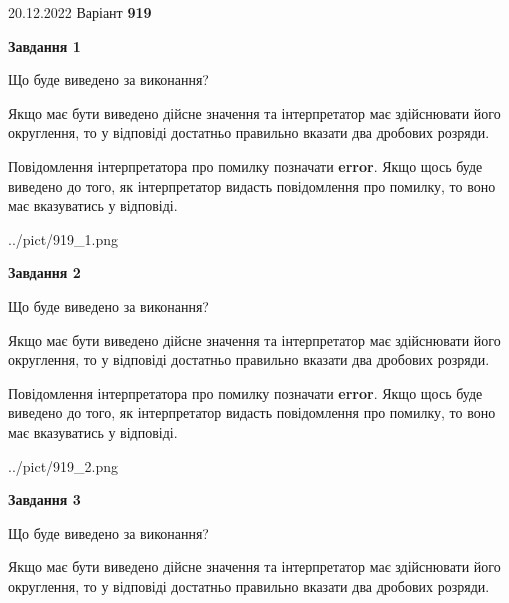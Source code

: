 \documentclass[12pt, ukrainian]{article}
\begin{document}
{20.12.2022 Варіант \No \textbf { 919 }\par}
{
\begin {Large}

{\begin {center}\textbf{Завдання 1}\end {center}}\par
Що буде виведено за виконання? \par

Якщо має бути виведено дійсне значення та інтерпретатор має здійснювати його округлення, 
то у відповіді достатньо правильно вказати два дробових розряди.

Повідомлення інтерпретатора про помилку позначати \textbf{error}.
Якщо щось буде виведено до того, як інтерпретатор видасть повідомлення про помилку, 
то воно має вказуватись у відповіді. \par

\begin{center}
	{../pict/919_1.png}
\end{center}
\newpage

{\begin {center}\textbf{Завдання 2}\end {center}}\par
Що буде виведено за виконання? \par

Якщо має бути виведено дійсне значення та інтерпретатор має здійснювати його округлення, 
то у відповіді достатньо правильно вказати два дробових розряди.

Повідомлення інтерпретатора про помилку позначати \textbf{error}.
Якщо щось буде виведено до того, як інтерпретатор видасть повідомлення про помилку, 
то воно має вказуватись у відповіді. \par

\begin{center}
	{../pict/919_2.png}
\end{center}
\newpage

{\begin {center}\textbf{Завдання 3}\end {center}}\par
Що буде виведено за виконання? \par

Якщо має бути виведено дійсне значення та інтерпретатор має здійснювати його округлення, 
то у відповіді достатньо правильно вказати два дробових розряди.


\end{Large}}
\end{document}
